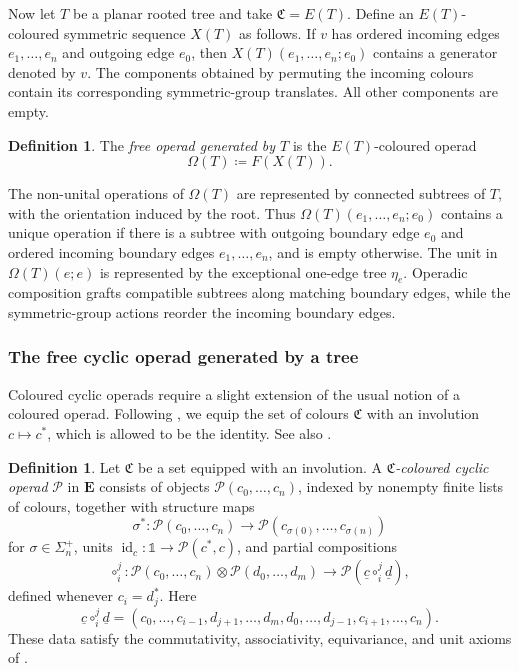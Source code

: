 \documentclass{amsart}
\newcommand{\bE}{\mathbf{E}}
\newcommand{\id}{\operatorname{id}}
\theoremstyle{definition}
\newtheorem{definition}[theorem]{Definition}%
\numberwithin{equation}{section}
\begin{document}
Now let $T$ be a planar rooted tree and take $\mathfrak C=E(T)$.
Define an $E(T)$-coloured symmetric sequence $X(T)$ as follows. If
$v$ has ordered incoming edges $e_1,\ldots,e_n$ and outgoing edge
$e_0$, then $X(T)(e_1,\ldots,e_n;e_0)$ contains a generator denoted
by $v$. The components obtained by permuting the incoming colours
contain its corresponding symmetric-group translates. All other
components are empty.

\begin{definition}
The \emph{free operad generated by $T$} is the $E(T)$-coloured
operad
\[
\Omega(T)\coloneqq F(X(T)).
\]
\end{definition}

The non-unital operations of $\Omega(T)$ are represented by connected
subtrees of $T$, with the orientation induced by the root. Thus
$\Omega(T)(e_1,\ldots,e_n;e_0)$ contains a unique operation if there
is a subtree with outgoing boundary edge $e_0$ and ordered incoming
boundary edges $e_1,\ldots,e_n$, and is empty otherwise. The unit in
$\Omega(T)(e;e)$ is represented by the exceptional one-edge tree
$\eta_e$. Operadic composition grafts compatible subtrees along
matching boundary edges, while the symmetric-group actions reorder
the incoming boundary edges.
\subsubsection{The free cyclic operad generated by a tree}
\label{sec:free cyclic operad}

Coloured cyclic operads require a slight extension of the usual
notion of a coloured operad. Following
\cite[Section~2.3]{DCH}, we equip the set of colours $\mathfrak C$
with an involution $c\mapsto c^*$, which is allowed to be the
identity. See also
\cite[Definition~3.2]{doherty2025models}.

\begin{definition}
\label{def: coloured cyclic operad}
Let $\mathfrak C$ be a set equipped with an involution. A
\emph{$\mathfrak C$-coloured cyclic operad} $\mathcal P$ in $\bE$
consists of objects $\mathcal P(c_0,\ldots,c_n)$, indexed by
nonempty finite lists of colours, together with structure maps
\[
\sigma^*\colon
\mathcal P(c_0,\ldots,c_n)
\longrightarrow
\mathcal P(c_{\sigma(0)},\ldots,c_{\sigma(n)})
\]
for $\sigma\in\Sigma_n^+$, units
$\id_c\colon\mathbb 1\to\mathcal P(c^*,c)$, and partial
compositions
\[
\circ_i^j\colon
\mathcal P(c_0,\ldots,c_n)\otimes
\mathcal P(d_0,\ldots,d_m)
\longrightarrow
\mathcal P(\underline c\circ_i^j\underline d),
\]
defined whenever $c_i=d_j^*$. Here
\[
\underline c\circ_i^j\underline d
=
(c_0,\ldots,c_{i-1},
d_{j+1},\ldots,d_m,d_0,\ldots,d_{j-1},
c_{i+1},\ldots,c_n).
\]
These data satisfy the commutativity, associativity, equivariance,
and unit axioms of \cite[Definition~2.3]{DCH}.
\end{definition}
\end{document}
